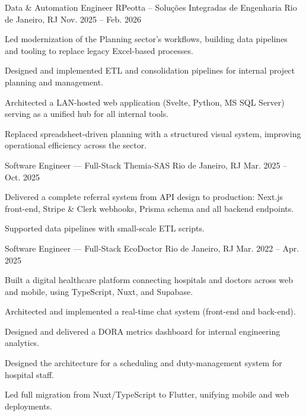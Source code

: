 \documentclass[11pt, a4paper]{awesome-cv}
\begin{document}
\begin{cventries}

  \cventry
    {Data \& Automation Engineer}
    {RPeotta -- Solu\c{c}\~oes Integradas de Engenharia}
    {Rio de Janeiro, RJ}
    {Nov. 2025 -- Feb. 2026}
    {
      \begin{cvitems}
        \item {Led modernization of the Planning sector's workflows, building data pipelines and tooling to replace legacy Excel-based processes.}
        \item {Designed and implemented ETL and consolidation pipelines for internal project planning and management.}
        \item {Architected a LAN-hosted web application (Svelte, Python, MS SQL Server) serving as a unified hub for all internal tools.}
        \item {Replaced spreadsheet-driven planning with a structured visual system, improving operational efficiency across the sector.}
      \end{cvitems}
    }

  \cventry
    {Software Engineer --- Full-Stack}
    {Themia-SAS}
    {Rio de Janeiro, RJ}
    {Mar. 2025 -- Oct. 2025}
    {
      \begin{cvitems}
        \item {Delivered a complete referral system from API design to production: Next.js front-end, Stripe \& Clerk webhooks, Prisma schema and all backend endpoints.}
        \item {Supported data pipelines with small-scale ETL scripts.}
      \end{cvitems}
    }

  \cventry
    {Software Engineer --- Full-Stack}
    {EcoDoctor}
    {Rio de Janeiro, RJ}
    {Mar. 2022 -- Apr. 2025}
    {
      \begin{cvitems}
        \item {Built a digital healthcare platform connecting hospitals and doctors across web and mobile, using TypeScript, Nuxt, and Supabase.}
        \item {Architected and implemented a real-time chat system (front-end and back-end).}
        \item {Designed and delivered a DORA metrics dashboard for internal engineering analytics.}
        \item {Designed the architecture for a scheduling and duty-management system for hospital staff.}
        \item {Led full migration from Nuxt/TypeScript to Flutter, unifying mobile and web deployments.}
      \end{cvitems}
    }


\end{cventries}
\end{document}
